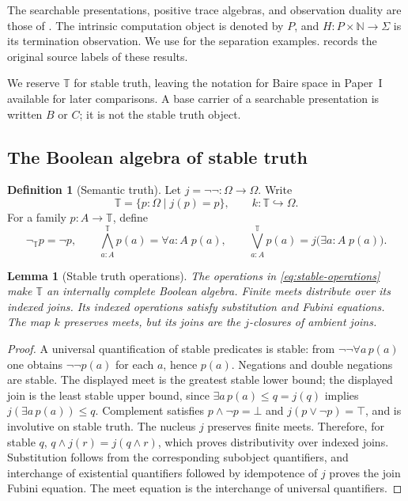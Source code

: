 \documentclass[11pt,a4paper]{article}
\numberwithin{equation}{section}
\newtheorem{lemma}[lemma]{Lemma}
\theoremstyle{definition}
\newtheorem{definition}[definition]{Definition}
\theoremstyle{remark}
\theoremstyle{plain}
\newcommand{\N}{\mathbb N}
\newcommand{\TV}{\mathbb T}
\newcommand{\incl}{\hookrightarrow}
\newcommand{\negT}{\neg_{\TV}}
\newcommand{\joinT}{\bigvee^{\TV}}
\newcommand{\meetT}{\bigwedge^{\TV}}
\newcommand{\Icite}[1]{\cite[\textnormal{#1}]{sheridan}}
\begin{document}
The searchable presentations, positive trace algebras, and observation
duality are those of \Icite{Searchable approximation presentations and
Two-spectrum reconstruction}. The intrinsic computation object is denoted
by $P$, and $H:P\times\N\to\Sigma$ is its termination observation.
We use \Icite{Intrinsic Rice and halting, Intrinsic finite information,
and the nonpositivity corollary} for the separation examples.
 records the original source labels of these results.

We reserve $\TV$ for stable truth, leaving the notation for Baire space
in Paper~I available for later comparisons. A base carrier of a searchable
presentation is written $B$ or $C$; it is not the stable truth object.

\subsection{The Boolean algebra of stable truth}

\begin{definition}[Semantic truth]
\label{def:semantic-truth}
Let $j=\neg\neg:\Omega\to\Omega$. Write
\[
 \TV=\{p:\Omega\mid j(p)=p\},\qquad k:\TV\incl\Omega.
\]
For a family $p:A\to\TV$, define
\begin{equation}\label{eq:stable-operations}
 \negT p=\neg p,\qquad
 \meetT_{a:A}p(a)=\forall a:A\;p(a),\qquad
 \joinT_{a:A}p(a)=j\bigl(\exists a:A\;p(a)\bigr).
\end{equation}
\end{definition}

\begin{lemma}[Stable truth operations]
\label{lem:stable-boolean}
The operations in \eqref{eq:stable-operations} make $\TV$ an internally
complete Boolean algebra. Finite meets distribute over its indexed joins.
Its indexed operations satisfy substitution and Fubini equations.
The map $k$ preserves meets, but its joins are the $j$-closures of ambient
joins.
\end{lemma}
\begin{proof}
A universal quantification of stable predicates is stable: from
$\neg\neg\forall a\,p(a)$ one obtains $\neg\neg p(a)$ for each $a$, hence
$p(a)$. Negations and double negations are stable. The displayed meet is
the greatest stable lower bound; the displayed join is the least stable
upper bound, since $\exists a\,p(a)\leq q=j(q)$ implies
$j(\exists a\,p(a))\leq q$. Complement satisfies
$p\wedge\neg p=\bot$ and $j(p\vee\neg p)=\top$, and is involutive on
stable truth. The nucleus $j$ preserves finite meets. Therefore, for stable
$q$, $q\wedge j(r)=j(q\wedge r)$, which proves distributivity over
indexed joins. Substitution follows from the corresponding subobject
quantifiers, and interchange of existential quantifiers followed by
idempotence of $j$ proves the join Fubini equation. The meet equation is
the interchange of universal quantifiers.
\end{proof}
\end{document}
